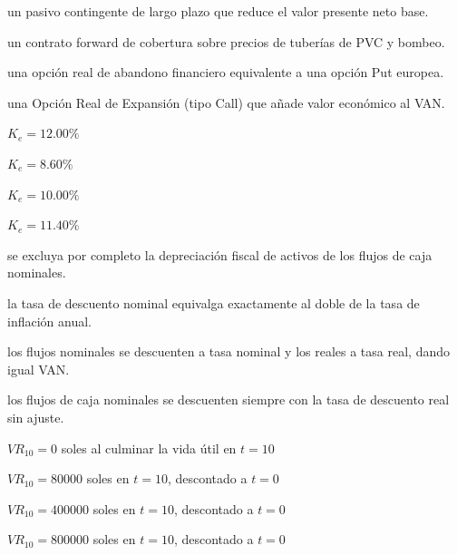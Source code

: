 \begin{opts}
    \item un pasivo contingente de largo plazo que reduce el valor presente neto base.
    \item un contrato forward de cobertura sobre precios de tuberías de PVC y bombeo.
    \item una opción real de abandono financiero equivalente a una opción Put europea.
    \item una Opción Real de Expansión (tipo Call) que añade valor económico al VAN.
\end{opts}

\begin{opts}
    \item $K_e = 12.00\%$
    \item $K_e = 8.60\%$
    \item $K_e = 10.00\%$
    \item $K_e = 11.40\%$
\end{opts}

\begin{opts}
    \item se excluya por completo la depreciación fiscal de activos de los flujos de caja nominales.
    \item la tasa de descuento nominal equivalga exactamente al doble de la tasa de inflación anual.
    \item los flujos nominales se descuenten a tasa nominal y los reales a tasa real, dando igual VAN.
    \item los flujos de caja nominales se descuenten siempre con la tasa de descuento real sin ajuste.
\end{opts}

\begin{opts}
    \item $VR_{10} = 0$ soles al culminar la vida útil en $t=10$
    \item $VR_{10} = 80000$ soles en $t=10$, descontado a $t=0$
    \item $VR_{10} = 400000$ soles en $t=10$, descontado a $t=0$
    \item $VR_{10} = 800000$ soles en $t=10$, descontado a $t=0$
\end{opts}

